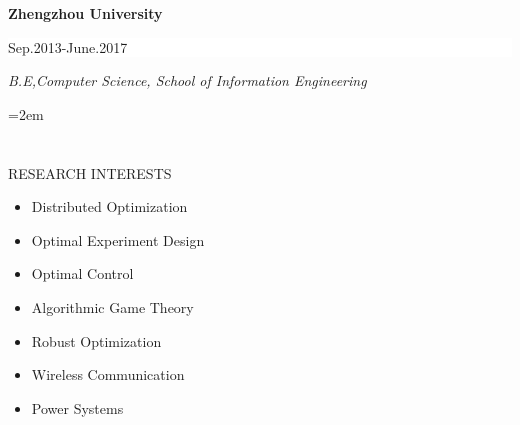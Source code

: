 \documentclass[paper=a4,fontsize=11pt]{scrartcl} %
\newcommand{\sepspace}{\vspace*{1em}}		%
\newcommand{\NewPart}[1]{\section*{\uppercase{#1}}}
\newcommand{\EducationEntry}[4]{
		\noindent \textbf{#1} \hfill      %
		\colorbox{White}{%
			\parbox{5cm}{%
			\hfill\color{Black}#2}} \par  %
		\noindent \textit{#3} \par        %
		\noindent\hangindent=2em\hangafter=0 \small #4 %
		\normalsize \par}
\begin{document}
\sepspace

\EducationEntry{Zhengzhou  University}{Sep.2013-June.2017}{B.E,Computer Science, School of Information Engineering  }

\NewPart{RESEARCH INTERESTS}{}
\begin{itemize}
	
	\item{Distributed Optimization}
	\item{Optimal Experiment Design}
	\item{Optimal Control}
	\item{Algorithmic Game Theory}
	\item{Robust Optimization}
\item{Wireless Communication}
	
	\item{Power Systems}
%	
	
\end{itemize}
\end{document}
